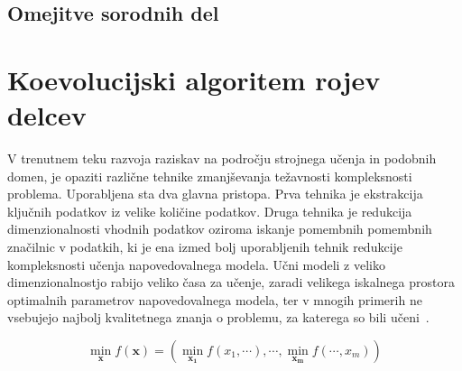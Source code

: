 
\section{Omejitve sorodnih del}


\chapter{Koevolucijski algoritem rojev delcev}\label{chap:algo}

V trenutnem teku razvoja raziskav na področju strojnega učenja in podobnih domen, je opaziti različne tehnike zmanjševanja težavnosti kompleksnosti problema.
Uporabljena sta dva glavna pristopa.
Prva tehnika je ekstrakcija ključnih podatkov iz velike količine podatkov.
Druga tehnika je redukcija dimenzionalnosti vhodnih podatkov oziroma iskanje pomembnih pomembnih značilnic v podatkih, ki je ena izmed bolj uporabljenih tehnik redukcije kompleksnosti učenja napovedovalnega modela. 
Učni modeli z veliko dimenzionalnostjo rabijo veliko časa za učenje, zaradi velikega iskalnega prostora optimalnih parametrov napovedovalnega modela, ter v mnogih primerih ne vsebujejo najbolj kvalitetnega znanja o problemu, za katerega so bili učeni~\cite{bib:si_machine_learning_bad_model}.

\begin{equation}
    \min_{\mathbf{x}}{f(\mathbf{x})} = \left( \min_{\mathbf{x_1}}{f(x_1,\cdots)}, \cdots , \min_{\mathbf{x_m}}{f(\cdots, x_m)} \right)
\end{equation}


